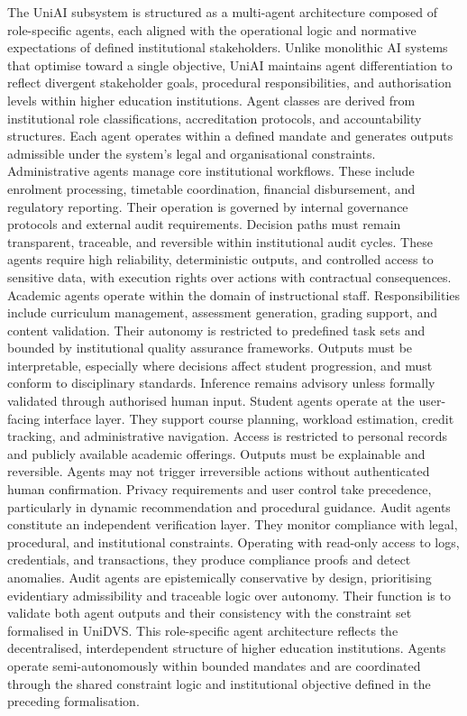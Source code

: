 \documentclass[oneside,10pt]{swissi}
\begin{document}
The UniAI subsystem is structured as a multi-agent architecture composed of role-specific agents, each aligned with the operational logic and normative expectations of defined institutional stakeholders. Unlike monolithic AI systems that optimise toward a single objective, UniAI maintains agent differentiation to reflect divergent stakeholder goals, procedural responsibilities, and authorisation levels within higher education institutions. Agent classes are derived from institutional role classifications, accreditation protocols, and accountability structures. Each agent operates within a defined mandate and generates outputs admissible under the system’s legal and organisational constraints. Administrative agents manage core institutional workflows. These include enrolment processing, timetable coordination, financial disbursement, and regulatory reporting. Their operation is governed by internal governance protocols and external audit requirements. Decision paths must remain transparent, traceable, and reversible within institutional audit cycles. These agents require high reliability, deterministic outputs, and controlled access to sensitive data, with execution rights over actions with contractual consequences. Academic agents operate within the domain of instructional staff. Responsibilities include curriculum management, assessment generation, grading support, and content validation. Their autonomy is restricted to predefined task sets and bounded by institutional quality assurance frameworks. Outputs must be interpretable, especially where decisions affect student progression, and must conform to disciplinary standards. Inference remains advisory unless formally validated through authorised human input. Student agents operate at the user-facing interface layer. They support course planning, workload estimation, credit tracking, and administrative navigation. Access is restricted to personal records and publicly available academic offerings. Outputs must be explainable and reversible. Agents may not trigger irreversible actions without authenticated human confirmation. Privacy requirements and user control take precedence, particularly in dynamic recommendation and procedural guidance. Audit agents constitute an independent verification layer. They monitor compliance with legal, procedural, and institutional constraints. Operating with read-only access to logs, credentials, and transactions, they produce compliance proofs and detect anomalies. Audit agents are epistemically conservative by design, prioritising evidentiary admissibility and traceable logic over autonomy. Their function is to validate both agent outputs and their consistency with the constraint set formalised in UniDVS. This role-specific agent architecture reflects the decentralised, interdependent structure of higher education institutions. Agents operate semi-autonomously within bounded mandates and are coordinated through the shared constraint logic and institutional objective defined in the preceding formalisation.
\end{document}
